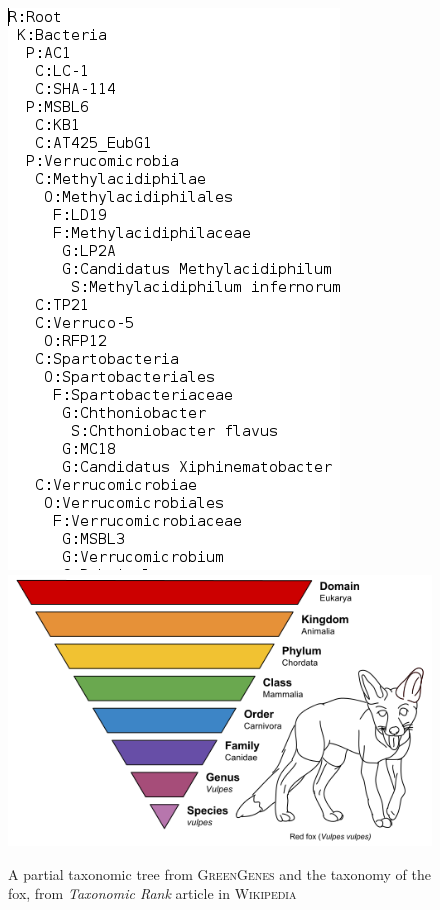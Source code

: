 \documentclass{report}
\begin{document}
\begin{figure}[H]
\begin{center}
\subfigure\includegraphics[scale=0.35]{illustrations/arbretaxo.png}
\subfigure\includegraphics[scale=0.35]{illustrations/Taxonomic_Rank.png}
\caption{A partial taxonomic tree from \textsc{GreenGenes} and the taxonomy of the fox, from \emph{Taxonomic Rank} article in \textsc{Wikipedia}}
\end{center}
\end{figure}
\end{document}
